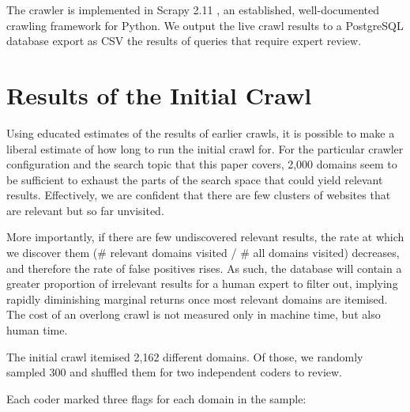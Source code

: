 \documentclass[conference]{IEEEtran}
\begin{document}
The crawler is implemented in Scrapy 2.11 \cite{scrapy}, an established, well-documented crawling framework for Python. We output the live crawl results to a PostgreSQL database export as CSV the results of queries that require expert review.



\section{Results of the Initial Crawl}
\label{sec:res}

Using educated estimates of the results of earlier crawls, it is possible to make a liberal estimate of how long to run the initial crawl for.
For the particular crawler configuration and the search topic that this paper covers, 2,000 domains seem to be sufficient to exhaust the parts of the search space that could yield relevant results.
Effectively, we are confident that there are few clusters of websites that are relevant but so far unvisited. 

More importantly, if there are few undiscovered relevant results, the rate at which we discover them (\# relevant domains visited / \# all domains visited) decreases, and therefore the rate of false positives rises.
As such, the database will contain a greater proportion of irrelevant results for a human expert to filter out, implying rapidly diminishing marginal returns once most relevant domains are itemised.
The cost of an overlong crawl is not measured only in machine time, but also human time.

The initial crawl itemised 2,162 different domains. Of those, we randomly sampled 300 and shuffled them for two independent coders to review.

Each coder marked three flags for each domain in the sample:
\end{document}
